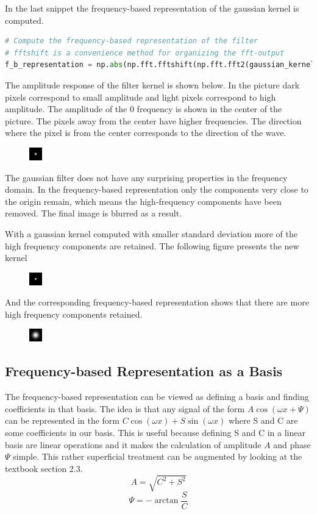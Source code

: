 \documentclass[]{article}
\begin{document}
In the last snippet the frequency-based representation of the gaussian kernel
is computed.
\begin{lstlisting}[language=Python]
# Compute the frequency-based representation of the filter
# fftshift is a convenience method for organizing the fft-output
f_b_representation = np.abs(np.fft.fftshift(np.fft.fft2(gaussian_kernel)))
\end{lstlisting}
The amplitude response of the filter kernel is shown below. In the picture dark
pixels correspond to small amplitude and light pixels correspond to high
amplitude. The amplitude of the 0 frequency is shown in the center of the
picture. The pixels away from the center have higher frequencies. The direction
where the pixel is from the center corresponds to the direction of the wave.
\begin{figure}
    \includegraphics{freq.png}
\end{figure}
The gaussian filter does not have any surprising properties in the frequency
domain. In the frequency-based representation only the components very close to
the origin remain, which means the high-frequency components have been removed.
The final image is blurred as a result.

With a gaussian kernel computed with smaller standard deviation more of the
high frequency components are retained. The following figure presents the 
new kernel
\begin{figure}
    \includegraphics{kernel2.png}
\end{figure}
And the corresponding frequency-based representation shows that there are more
high frequency components retained.
\begin{figure}
    \includegraphics{freq2.png}
\end{figure}

\subsection{Frequency-based Representation as a Basis}
\label{frequency-based-representation-as-a-basis}
The frequency-based representation can be viewed as defining a basis and
finding coefficients in that basis. The idea is that any signal of the form $A
\cos(\omega x + \Psi)$ can be represented in the form $C\cos(\omega x) +
S\sin(\omega x)$ where S and C are some coefficients in our basis. This is
useful because defining S and C in a linear basis are linear operations and it
makes the calculation of amplitude $A$ and phase $\Psi$ simple. This rather
superficial treatment can be augmented by looking at the textbook section 2.3.
\begin{equation}
  A = \sqrt{C^{2}+S^{2}}
\end{equation}
\begin{equation}
  \Psi = -\arctan{\frac{S}{C}}
\end{equation}
\end{document}
